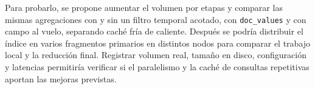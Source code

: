 \documentclass[11pt,a4paper]{article}
\newcommand{\codigo}[1]{\texttt{#1}}
\begin{document}
Para probarlo, se propone aumentar el volumen por etapas y comparar las
mismas agregaciones con y sin un filtro temporal acotado, con
\codigo{doc\_values} y con campo al vuelo, separando caché fría de caliente.
Después se podría distribuir el índice en varios fragmentos primarios
en distintos nodos para comparar el trabajo local y la reducción final.
Registrar volumen real, tamaño en disco, configuración y latencias
permitiría verificar si el paralelismo y la caché de consultas repetitivas
aportan las mejoras previstas.
\end{document}
